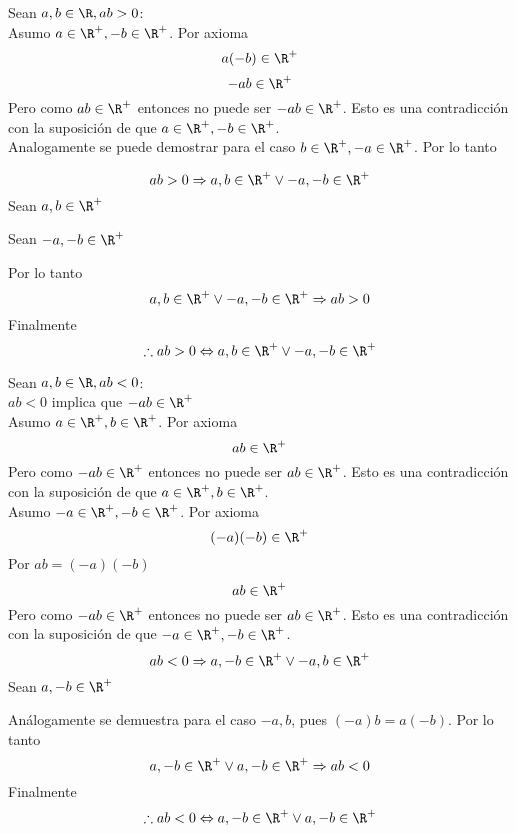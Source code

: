\documentclass[10pt]{article}
\begin{document}
\begin{prf}{}
	Sean $a,b \in \R, ab > 0$:\\
	Asumo $a \in \R^+, -b \in \R^+$. Por axioma
	$$ a(-b) \in \R^+$$
	$$ -ab \in \R^+$$
	Pero como $ab \in \R^+$ entonces no puede ser $-ab \in \R^+$.
	Esto es una contradicción con la suposición de que $a \in \R^+, -b \in \R^+$.\\
	Analogamente se puede demostrar para el caso $b \in \R^+, -a \in \R^+$. Por lo tanto

	$$ab > 0 \Rightarrow a,b \in \R^+ \lor -a,-b \in \R^+$$
	Sean $a,b \in \R^+$

	Sean $-a,-b \in \R^+$

	Por lo tanto
	$$a,b \in \R^+ \lor -a,-b \in \R^+ \Rightarrow ab > 0$$
	Finalmente
	$$\therefore ab > 0 \Leftrightarrow a,b \in \R^+ \lor -a,-b \in \R^+$$
\end{prf}

\begin{prf}{}
	Sean $a,b \in \R, ab < 0$:\\
	$ab < 0$ implica que $-ab \in \R^+$\\
	Asumo $a \in \R^+, b \in \R^+$. Por axioma
	$$ab \in \R^+$$
	Pero como $-ab \in \R^+$ entonces no puede ser $ab \in \R^+$.
	Esto es una contradicción con la suposición de que $a \in \R^+, b \in \R^+$.\\
	Asumo $-a \in \R^+, -b \in \R^+$. Por axioma
	$$(-a)(-b) \in \R^+$$
	Por $ab = (-a)(-b)$
	$$ab \in \R^+$$
	Pero como $-ab \in \R^+$ entonces no puede ser $ab \in \R^+$.
	Esto es una contradicción con la suposición de que $-a \in \R^+, -b \in \R^+$.\\

	$$ab < 0 \Rightarrow a,-b \in \R^+ \lor -a,b \in \R^+$$
	Sean $a,-b \in \R^+$

	Análogamente se demuestra para el caso $-a,b$, pues $(-a)b = a(-b)$.
	Por lo tanto
	$$a,-b \in \R^+ \lor a,-b \in \R^+ \Rightarrow ab < 0$$
	Finalmente
	$$\therefore ab < 0 \Leftrightarrow a,-b \in \R^+ \lor a,-b \in \R^+$$
\end{prf}
\end{document}
